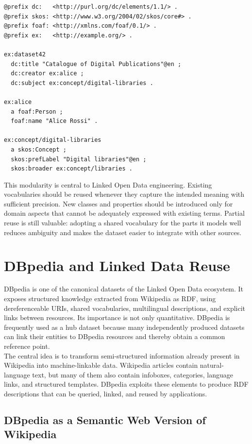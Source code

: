 \documentclass{scrbook}
\begin{document}
	\begin{lstlisting}
@prefix dc:   <http://purl.org/dc/elements/1.1/> .
@prefix skos: <http://www.w3.org/2004/02/skos/core#> .
@prefix foaf: <http://xmlns.com/foaf/0.1/> .
@prefix ex:   <http://example.org/> .
	
ex:dataset42
  dc:title "Catalogue of Digital Publications"@en ;
  dc:creator ex:alice ;
  dc:subject ex:concept/digital-libraries .
	
ex:alice
  a foaf:Person ;
  foaf:name "Alice Rossi" .
	
ex:concept/digital-libraries
  a skos:Concept ;
  skos:prefLabel "Digital libraries"@en ;
  skos:broader ex:concept/libraries .
	\end{lstlisting}
	
	This modularity is central to Linked Open Data engineering. Existing vocabularies should be reused whenever they capture the intended meaning with sufficient precision. New classes and properties should be introduced only for domain aspects that cannot be adequately expressed with existing terms. Partial reuse is still valuable: adopting a shared vocabulary for the parts it models well reduces ambiguity and makes the dataset easier to integrate with other sources.
	
	\chapter{DBpedia and Linked Data Reuse}
	
	DBpedia is one of the canonical datasets of the Linked Open Data ecosystem. It exposes structured knowledge extracted from Wikipedia as RDF, using dereferenceable URIs, shared vocabularies, multilingual descriptions, and explicit links between resources. Its importance is not only quantitative. DBpedia is frequently used as a hub dataset because many independently produced datasets can link their entities to DBpedia resources and thereby obtain a common reference point.\\
	
	The central idea is to transform semi-structured information already present in Wikipedia into machine-linkable data. Wikipedia articles contain natural-language text, but many of them also contain infoboxes, categories, language links, and structured templates. DBpedia exploits these elements to produce RDF descriptions that can be queried, linked, and reused by applications.
	
	\section{DBpedia as a Semantic Web Version of Wikipedia}
	
\end{document}
